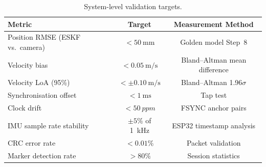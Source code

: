 \begin{table}[H]
  \centering
  \caption{System-level validation targets.}
  \label{tab:validation_summary}
  \begin{tabular}{lcc}
    \toprule
    \textbf{Metric} & \textbf{Target} & \textbf{Measurement Method} \\
    \midrule
    Position RMSE (ESKF vs.\ camera)    & $< \SI{50}{\milli\metre}$         & Golden model Step~8 \\
    Velocity bias                       & $< \SI{0.05}{\metre\per\second}$   & Bland--Altman mean difference \\
    Velocity LoA (95\%)                 & $< \pm\SI{0.10}{\metre\per\second}$ & Bland--Altman 1.96$\sigma$ \\
    Synchronisation offset              & $< \SI{1}{\milli\second}$         & Tap test \\
    Clock drift                         & $< \SI{50}{ppm}$                  & FSYNC anchor pairs \\
    IMU sample rate stability           & $\pm 5\%$ of \SI{1}{\kilo\hertz}  & ESP32 timestamp analysis \\
    CRC error rate                      & $< 0.01\%$                        & Packet validation \\
    Marker detection rate               & $> 80\%$                          & Session statistics \\
    \bottomrule
  \end{tabular}
\end{table}
